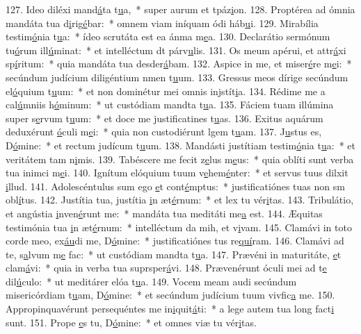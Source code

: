 127. Ideo diléxi mand\uline{á}ta t\uline{u}a,~* super aurum et tpáz\uline{i}on.
128. Proptérea ad ómnia mandáta tua d\uline{i}rig\uline{é}bar:~* omnem viam iníquam ódi háb\uline{u}i.
129. Mirabília testim\uline{ó}nia t\uline{u}a:~* ídeo scrutáta est ea ánma m\uline{e}a.
130. Declarátio sermónum tu\uline{ó}rum ill\uline{ú}minat:~* et intelléctum dt párv\uline{u}lis.
131. Os meum apérui, et attr\uline{á}xi sp\uline{í}ritum:~* quia mandáta tua desder\uline{á}bam.
132. Aspice in me, et miser\uline{é}re m\uline{e}i:~* secúndum judícium diligéntium nmen t\uline{u}um.
133. Gressus meos dírige secúndum el\uline{ó}quium t\uline{u}um:~* et non dominétur mei omnis injstít\uline{i}a.
134. Rédime me a cal\uline{ú}mniis h\uline{ó}minum:~* ut custódiam mandta t\uline{u}a.
135. Fáciem tuam illúmina super s\uline{e}rvum t\uline{u}um:~* et doce me justificatines t\uline{u}as.
136. Exitus aquárum deduxérunt \uline{ó}culi m\uline{e}i:~* quia non custodiérunt lgem t\uline{u}am.
137. J\uline{u}stus es, D\uline{ó}mine:~* et rectum judícum t\uline{u}um.
138. Mandásti justítiam testim\uline{ó}nia t\uline{u}a:~* et veritátem tam n\uline{i}mis.
139. Tabéscere me fecit z\uline{e}lus m\uline{e}us:~* quia oblíti sunt verba tua inimci m\uline{e}i.
140. Ignítum elóquium tuum v\uline{e}hem\uline{é}nter:~* et servus tuus dilxit \uline{i}llud.
141. Adolescéntulus sum ego \uline{e}t cont\uline{é}mptus:~* justificatiónes tuas non sm obl\uline{í}tus.
142. Justítia tua, justítia \uline{i}n æt\uline{é}rnum:~* et lex tu vér\uline{i}tas.
143. Tribulátio, et angústia \uline{i}nven\uline{é}runt me:~* mandáta tua meditáti me\uline{a} est.
144. Æquitas testimónia tua \uline{i}n æt\uline{é}rnum:~* intelléctum da mih, et v\uline{i}vam.
145. Clamávi in toto corde meo, ex\uline{áu}di me, D\uline{ó}mine:~* justificatiónes tus re\uline{quí}ram.
146. Clamávi ad te, s\uline{a}lvum m\uline{e} fac:~* ut custódiam mandta t\uline{u}a.
147. Prævéni in maturitáte, \uline{e}t clam\uline{á}vi:~* quia in verba tua suprsper\uline{á}vi.
148. Prævenérunt óculi mei ad t\uline{e} dil\uline{ú}culo:~* ut meditárer elóa t\uline{u}a.
149. Vocem meam audi secúndum misericórdiam t\uline{u}am, D\uline{ó}mine:~* et secúndum judícium tuum vivfic\uline{a} me.
150. Appropinquavérunt persequéntes me in\uline{i}quit\uline{á}ti:~* a lege autem tua long fact\uline{i} sunt.
151. Prope \uline{e}s tu, D\uline{ó}mine:~* et omnes viæ tu vér\uline{i}tas.
